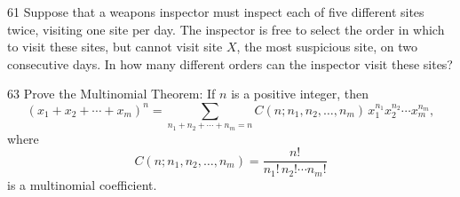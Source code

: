 \documentclass[11pt]{article}
\begin{document}
\begin{exercise}{61}
    Suppose that a weapons inspector must inspect each of five
    different sites twice, visiting one site per day. The inspector
    is free to select the order in which to visit these sites, but
    cannot visit site $X$, the most suspicious site, on two
    consecutive days. In how many different orders can the inspector
    visit these sites?
\end{exercise}

\begin{exercise}{63}
    Prove the Multinomial Theorem: If $n$ is a positive integer, then
    \[
    (x_1 + x_2 + \cdots + x_m)^n = \sum_{n_1+n_2+\cdots+n_m=n}
    C(n; n_1, n_2, \dots, n_m)\, x_1^{n_1} x_2^{n_2} \cdots
    x_m^{n_m},
    \]
    where
    \[
    C(n; n_1, n_2, \dots, n_m) = \frac{n!}{n_1!\, n_2! \cdots n_m!}
    \]
    is a multinomial coefficient.
\end{exercise}
\end{document}
